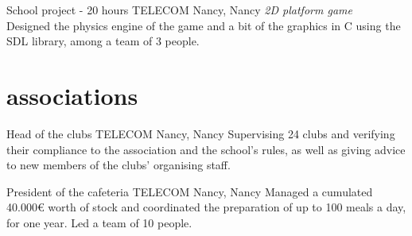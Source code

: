 \documentclass[]{lemaki-cv}
\begin{document}
\begin{entrylist}

			{School project {\normalfont{}- 20 hours}}
			{TELECOM Nancy, Nancy}
			{\emph{2D platform game} \\
			Designed the physics engine of the game and a bit of the graphics in
			C using the SDL library, among a team of 3 people.}


		\end{entrylist}
	

		\section{associations}

		\begin{entrylist}


			{Head of the clubs}
			{TELECOM Nancy, Nancy}
			{Supervising 24 clubs and verifying their compliance to the
			association and the school's rules, as well as giving advice to new
			members of the clubs' organising staff.}


			{President of the cafeteria}
			{TELECOM Nancy, Nancy}
			{Managed a cumulated 40.000€ worth of stock and coordinated the
			preparation of up to 100 meals a day, for one year. Led a team of 10
			people.}


		\end{entrylist}
\end{document}
